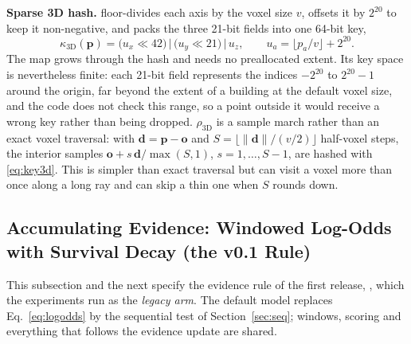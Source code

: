 \noindent\textbf{Sparse 3D hash.}  floor-divides each axis by the voxel size $v$, offsets it by $2^{20}$ to keep it non-negative, and packs the three 21-bit fields into one 64-bit key,
\begin{equation}\label{eq:key3d}
  \kappa_{\mathrm{3D}}(\mathbf{p})=\big(u_x\ll 42\big)\,\big|\,\big(u_y\ll 21\big)\,\big|\,u_z,\qquad u_a=\lfloor p_a/v\rfloor+2^{20}.
\end{equation}
The map grows through the hash and needs no preallocated extent. Its key space is nevertheless finite: each 21-bit field represents the indices $-2^{20}$ to $2^{20}-1$ around the origin, far beyond the extent of a building at the default voxel size, and the code does not check this range, so a point outside it would receive a wrong key rather than being dropped. $\rho_{\mathrm{3D}}$ is a sample march rather than an exact voxel traversal: with $\mathbf{d}=\mathbf{p}-\mathbf{o}$ and $S=\lfloor\|\mathbf{d}\|/(v/2)\rfloor$ half-voxel steps, the interior samples $\mathbf{o}+s\,\mathbf{d}/\max(S,1)$, $s=1,\dots,S{-}1$, are hashed with \eqref{eq:key3d}. This is simpler than exact traversal but can visit a voxel more than once along a long ray and can skip a thin one when $S$ rounds down.

\subsection{Accumulating Evidence: Windowed Log-Odds with Survival Decay (the v0.1 Rule)}\label{subsec:logodds}

This subsection and the next specify the evidence rule of the first release, , which the experiments run as the \emph{legacy arm}. The default model replaces Eq.~\eqref{eq:logodds} by the sequential test of Section~\ref{sec:seq}; windows, scoring and everything that follows the evidence update are shared.

